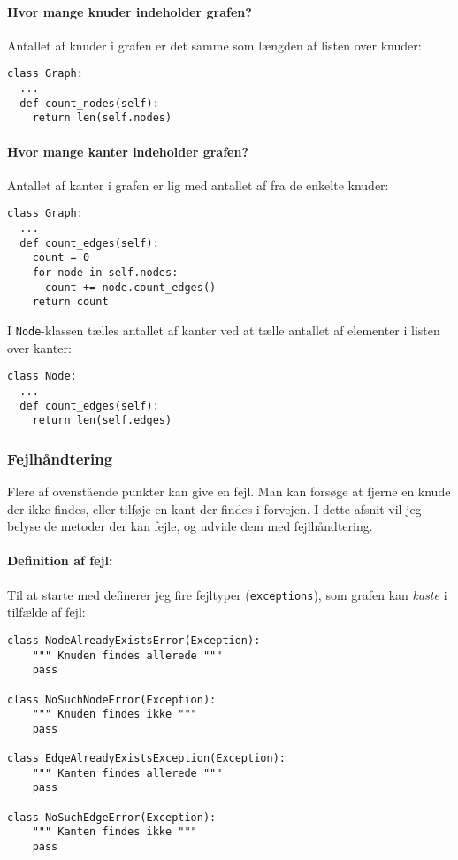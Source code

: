 \documentclass[10pt,a4paper,danish]{article}
\newcommand{\ct}{\texttt}
\begin{document}
\paragraph{Hvor mange knuder indeholder grafen?}
Antallet af knuder i grafen er det samme som længden af listen over
knuder:
{\small
\begin{verbatim}
class Graph:
  ...
  def count_nodes(self):
    return len(self.nodes)
\end{verbatim}}

\paragraph{Hvor mange kanter indeholder grafen?}
Antallet af kanter i grafen er lig med antallet af fra de enkelte
knuder:
{\small
\begin{verbatim}
class Graph:
  ...
  def count_edges(self):
    count = 0
    for node in self.nodes:
      count += node.count_edges()
    return count
\end{verbatim}}

I \ct{Node}-klassen tælles antallet af kanter ved at tælle antallet af
elementer i listen over kanter:
{\small
\begin{verbatim}
class Node:
  ...
  def count_edges(self):
    return len(self.edges)
\end{verbatim}}


\subsubsection{Fejlhåndtering}
Flere af ovenstående punkter kan give en fejl. Man kan forsøge at
fjerne en knude der ikke findes, eller tilføje en kant der findes i
forvejen. I dette afsnit vil jeg belyse de metoder der kan fejle, og
udvide dem med fejlhåndtering.

\paragraph{Definition af fejl:}
Til at starte med definerer jeg fire fejltyper (\ct{exceptions}), som
grafen kan \textit{kaste} i tilfælde af fejl:
{\small
\begin{verbatim}
class NodeAlreadyExistsError(Exception):
    """ Knuden findes allerede """
    pass

class NoSuchNodeError(Exception):
    """ Knuden findes ikke """
    pass

class EdgeAlreadyExistsException(Exception):
    """ Kanten findes allerede """
    pass

class NoSuchEdgeError(Exception):
    """ Kanten findes ikke """
    pass
\end{verbatim}}
\end{document}

